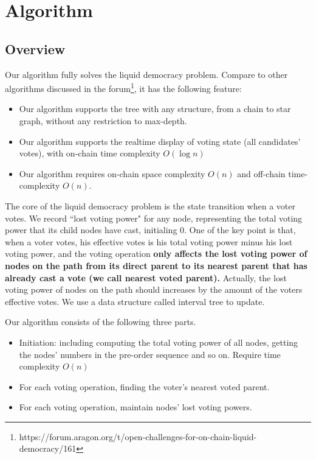 \section{Algorithm}
\subsection{Overview}
Our algorithm fully solves the liquid democracy problem. Compare to other algorithms discussed in the forum\footnote{https://forum.aragon.org/t/open-challenges-for-on-chain-liquid-democracy/161}, it has the following feature:
\begin{itemize}
	\item Our algorithm supports the tree with any structure, from a chain to star graph, without any restriction to max-depth.
	\item Our algorithm supports the realtime display of voting state (all candidates' votes), with on-chain time complexity $O(\log n)$
	\item Our algorithm requires on-chain space complexity $O(n)$ and off-chain time-complexity $O(n)$.
\end{itemize}
The core of the liquid democracy problem is the state transition when a voter votes. We record ``lost voting power" for any node, representing the total voting power that its child nodes have cast, initialing 0.  One of the key point is that, when a voter votes, his effective votes is his total voting power minus his lost voting power, and the voting operation \textbf{only affects the lost voting power of nodes on the path from its direct parent to its nearest parent that has already cast a vote (we call nearest voted parent).} Actually, the lost voting power of nodes on the path should increases by the amount of the voters effective votes. We use a data structure called interval tree to update.

Our algorithm consists of the following three parts.
\begin{itemize}
	\item Initiation: including computing the total voting power of all nodes, getting the nodes' numbers in the pre-order sequence and so on. Require time complexity $O(n)$
	\item For each voting operation, finding the voter's nearest voted parent.
	\item For each voting operation, maintain nodes' lost voting powers.
\end{itemize}

